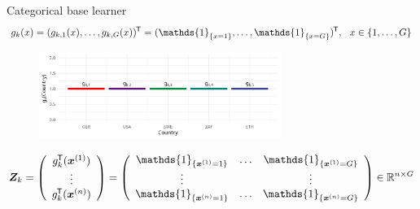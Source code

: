 \documentclass[t,10pt]{beamer}
\begin{document}
\begin{frame}{Categorical base learner}
  \vspace{-0.3cm}\[g_k(x) = (g_{k,1}(x), \dots, g_{k,G}(x))^\tran = (\mathds{1}_{\{x = 1\}}, \dots, \mathds{1}_{\{x = G\}})^\tran, \ \ x\in\{1, \dots, G\}\]
  \begin{center}
    \begin{figure}
      \includegraphics[width=0.7\textwidth]{figures/bs-cat/fig-cat0.png}
    \end{figure}
    \vspace{-0.5cm}
    \[
    \design_k = \left(\begin{array}{c}
      g_{k}^\tran(\xi[1]) \\
      \vdots \\
      g_{k}^\tran(\xi[n])
    \end{array}\right) = \left(\begin{array}{ccc}
      \mathds{1}_{\{\xi[1] = 1\}} & \dots & \mathds{1}_{\{\xi[1] = G\}} \\
      \vdots &  & \vdots \\
      \mathds{1}_{\{\xi[n] = 1\}} & \dots & \mathds{1}_{\{\xi[n] = G\}} \\
    \end{array}\right)\in\R^{n\times G}
    \]
  \end{center}

\end{frame}
\end{document}
